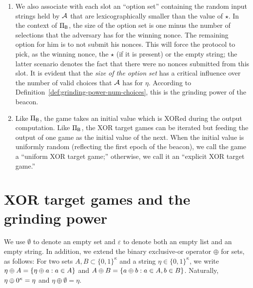 \begin{enumerate}
    \item We also associate with each slot an ``option set'' 
    containing the random input strings held by $\mathcal{A}$ 
    that are lexicographically smaller than the value of $\star$.
    In the context of $\Pi_{\mathsf{B}}$, the size of the option set 
    is one minus the number of selections that the adversary has for 
    the winning nonce. 
    The remaining option for him is to not submit his nonces. 
    This will force the protocol to pick, as the winning nonce, 
    the $\star$ (if it is present) or the empty string; 
    the latter scenario denotes the fact that there were no nonces submitted from this slot.
    It is evident that the \emph{size of the option set} has a critical influence 
    over the number of valid choices that $\mathcal{A}$ has for $\eta$. 
    According to Definition~\ref{def:grinding-power-num-choices}, 
    this is the grinding power of the beacon.

    \item Like $\Pi_{\mathsf{B}}$, the game takes an initial value which is XORed during the output computation.
    Like $\Pi_{\mathsf{B}}$, the XOR target games can be iterated but 
    feeding the output of one game as the initial value of the next. 
    When the initial value is uniformly random (reflecting the first epoch of the beacon), 
    we call the game a ``uniform XOR target game;'' 
    otherwise, we call it an ``explicit XOR target game.''
\end{enumerate}





\section{XOR target games and the grinding power}\label{sec:xor-target-game-def}

\newcommand{\NumSets}{n}
\newcommand{\NumSync}{m}
\newcommand{\SecParam}{\kappa}
\newcommand{\EmptyList}{\varepsilon}
\newcommand{\GrindingPower}{g}
\newcommand{\GrindingMax}{\gamma}
\newcommand{\GrindingSet}{X^*}


We use $\emptyset$ to denote an empty set and 
$\varepsilon$ to denote both an empty list and an empty string. 
In addition, we extend the binary exclusive-or operator $\oplus$ for sets, as follows: 
For two sets $A,B \subset \{0,1\}^\kappa$ and a string $\eta \in \{0,1\}^\kappa$, 
we write
$\eta \oplus A = \{\eta \oplus a : a \in A\}$ and
$A \oplus B = \{a \oplus b : a \in A, b \in B\}$. 
Naturally, $\eta \oplus 0^{\kappa} = \eta$ and $\eta \oplus \emptyset = \eta$.



